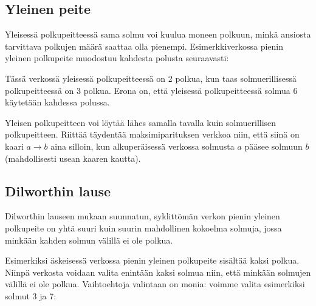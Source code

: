 \subsection{Yleinen peite}

Yleisessä polkupeitteessä sama solmu voi kuulua moneen polkuun,
minkä ansiosta tarvittava polkujen määrä saattaa olla pienempi.
Esimerkkiverkossa pienin yleinen polkupeite muodostuu
kahdesta polusta seuraavasti:

\begin{center}
\end{center}

Tässä verkossä yleisessä polkupeitteessä on 2 polkua,
kun taas solmuerillisessä polkupeitteessä on 3 polkua.
Erona on, että yleisessä polkupeitteessä solmua 6
käytetään kahdessa polussa.

Yleisen polkupeitteen voi löytää lähes samalla
tavalla kuin solmuerillisen polkupeitteen.
Riittää täydentää maksimiparituksen verkkoa niin,
että siinä on kaari $a \rightarrow b$ aina silloin,
kun alkuperäisessä verkossa solmusta $a$ pääsee
solmuun $b$ (mahdollisesti usean kaaren kautta).

\subsection{Dilworthin lause}

Dilworthin lauseen mukaan suunnatun, syklittömän
verkon pienin yleinen polkupeite
on yhtä suuri kuin suurin
mahdollinen kokoelma solmuja,
jossa minkään kahden solmun välillä ei ole polkua.

Esimerkiksi äskeisessä verkossa pienin
yleinen polkupeite sisältää kaksi polkua.
Niinpä verkosta voidaan valita enintään kaksi
solmua niin, että minkään solmujen välillä ei ole polkua.
Vaihtoehtoja valintaan on monia: voimme valita esimerkiksi
solmut 3 ja 7:

